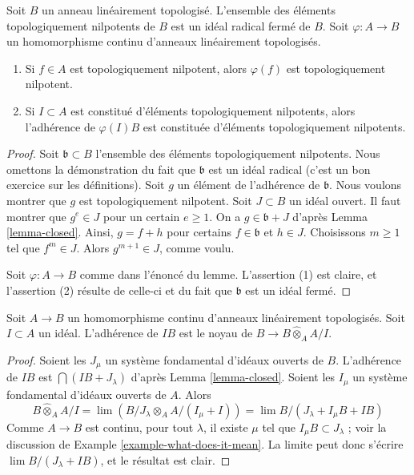 \begin{lemma}
\label{lemma-topologically-nilpotent}
Soit $B$ un anneau linéairement topologisé. L'ensemble des éléments topologiquement nilpotents
de $B$ est un idéal radical fermé de $B$.
Soit $\varphi : A \to B$ un homomorphisme continu d'anneaux linéairement topologisés.
\begin{enumerate}
\item Si $f \in A$ est topologiquement nilpotent, alors $\varphi(f)$ est
topologiquement nilpotent.
\item Si $I \subset A$ est constitué d'éléments topologiquement nilpotents,
alors l'adhérence de $\varphi(I)B$ est constituée d'éléments topologiquement
nilpotents.
\end{enumerate}
\end{lemma}

\begin{proof}
Soit $\mathfrak b \subset B$ l'ensemble des éléments topologiquement nilpotents.
Nous omettons la démonstration du fait que $\mathfrak b$ est un idéal radical
(c'est un bon exercice sur les définitions). Soit $g$ un élément de l'adhérence
de $\mathfrak b$. Nous voulons montrer que $g$ est topologiquement nilpotent.
Soit $J \subset B$ un idéal ouvert. Il faut montrer que
$g^e \in J$ pour un certain $e \geq 1$. On a $g \in \mathfrak b + J$
d'après Lemma \ref{lemma-closed}. Ainsi, $g = f + h$
pour certains $f \in \mathfrak b$ et $h \in J$. Choisissons $m \geq 1$ tel que
$f^m \in J$. Alors $g^{m + 1} \in J$, comme voulu.

\medskip\noindent
Soit $\varphi : A \to B$ comme dans l'énoncé du lemme.
L'assertion (1) est claire, et l'assertion (2) résulte de celle-ci et
du fait que $\mathfrak b$ est un idéal fermé.
\end{proof}

\begin{lemma}
\label{lemma-closure-image-ideal}
Soit $A \to B$ un homomorphisme continu d'anneaux linéairement topologisés.
Soit $I \subset A$ un idéal. L'adhérence de $IB$
est le noyau de $B \to B \widehat{\otimes}_A A/I$.
\end{lemma}

\begin{proof}
Soient les $J_\mu$ un système fondamental d'idéaux ouverts de $B$.
L'adhérence de $IB$ est $\bigcap (IB + J_\lambda)$ d'après Lemma \ref{lemma-closed}.
Soient les $I_\mu$ un système fondamental d'idéaux ouverts de $A$.
Alors
$$
B \widehat{\otimes}_A A/I = \lim (B/J_\lambda \otimes_A A/(I_\mu + I)) =
\lim B/(J_\lambda + I_\mu B + I B)
$$
Comme $A \to B$ est continu, pour tout $\lambda$, il
existe $\mu$ tel que $I_\mu B \subset J_\lambda$ ; voir la discussion de
Example \ref{example-what-does-it-mean}. La limite peut donc
s'écrire $\lim B/(J_\lambda + IB)$, et le résultat est clair.
\end{proof}

